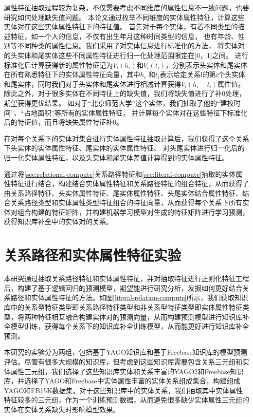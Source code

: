 属性特征抽取过程较为复杂，不仅需要考虑不同维度的属性信息不一致问题，也要研究如何处理缺失值问题。
本论文通过枚举不同维度的实体属性特征，计算这些实体对在这些实体属性特征下的特征值。
首先对于每个实体，有着不同类型的描述特征，如一个人的信息，不仅有出生年月这种时间类型的信息，
也有年龄、性别等不同种类的属性信息。我们采用了对实体信息进行标准化的方法，
将实体对的头实体和尾实体这些不同属性特征进行归一化处理范围限定在[0，1]之间。
进行标准化后计算获得新的属性特征记为$V_l(h_i)$和$V_l (t_i)$，分别表示头实体和尾实体在所有熟悉特征下的实体属性特征向量，其中$h_i$ 和$t_i$表示给定关系l的第i个头实体和尾实体，同时我们对于头实体和尾实体进行相减计算获得$V_l(h_i-t_i )$属性值。除此之外，对于很多实体在不同特征上的缺失值，我们将缺失值进行了补0处理，期望获得更优结果。
如对于“北京师范大学”这个实体，我们抽取了他的“建校时间”、“占地面积”等所有的实体属性特征，
并计算每个实体对在这些特征下标准化后的特征值，而且将缺失属性特征补0。

在对每个关系下的实体对集合进行实体属性特征抽取计算后，我们获得了这个关系下头实体的实体属性特征、尾实体的实体属性特征、
对头尾实体进行归一化后的归一化实体属性特征，以及头实体和尾实体差值计算得到的实体属性特征。

通过将\ref{sec:relational-compute}关系路径特征和\ref{sec:literal-compute}抽取的实体属性特征进行结合，构建结合实体属性特征和关系路径特征的组合特征，从而获得了由关系路径特征、头实体属性特征、尾实体属性特征、头尾实体结合属性特征、结合关系路径类型和实体属性类型特征组合的特征向量，从而获得每个关系下所有实体对组合构建的特征矩阵，并构建机器学习模型对生成的特征矩阵进行学习预测，获得知识库补全中的实体对的关系。


\section{关系路径和实体属性特征实验}

本研究通过抽取关系路径特征和实体属性特征，并对抽取特征进行正则化特征工程后，构建了基于逻辑回归的预测模型，期望能进行研究分析，发掘如何更好结合关系路径和实体属性特征的方法。如图\ref{literal-relation-compute}所示，我们获取知识库中的关系型特征类型即关系路径特征类型和非关系型特征类型即实体属性特征类型，将两种特征相互融合构建实体对的预测向量，从而构建预测模型进行知识库补全模型训练，获得每个关系下的知识库补全训练模型，从而能更好进行知识库补全预测。


本研究的实验分为两组，包括基于YAGO知识库和基于Freebase知识库的模型预测评估。尽管有很多大规模的知识库，但考虑到这些知识库需要包含关系三元组和实体属性三元组，我们选择了这些知识库实体和关系丰富的YAGO2和Freebase知识库，并选择了YAGO和Freebase中实体属性丰富的实体关系组成集合，构建组成YAGO和FB15K数据集。对于这些知识库中的实体关系，我们抽取其中实体属性特征较多的三元组，作为一个训练预测数据，从而避免很多缺少实体属性三元组的实体在实体关系缺失时影响模型效果。


